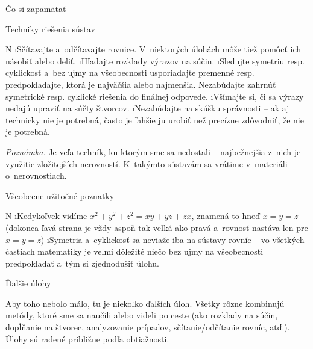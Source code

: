 \sec Čo si zapamätať

\secc Techniky riešenia sústav

\begitems \style N
\i Sčítavajte a~odčítavajte rovnice. V~niektorých úlohách môže tiež pomôcť ich násobiť alebo deliť.
\i Hľadajte rozklady výrazov na súčin. 
\i Sledujte symetriu resp. cyklickosť a~bez ujmy na všeobecnosti usporiadajte premenné resp. predpokladajte, ktorá je najväčšia alebo najmenšia. Nezabúdajte zahrnúť symetrické resp. cyklické riešenia do finálnej odpovede.
\i Všímajte si, či sa výrazy nedajú upraviť na súčty štvorcov. 
\i Nezabúdajte na skúšku správnosti -- ak aj technicky nie je potrebná, často je ľahšie ju urobiť než precízne zdôvodniť, že nie je potrebná.
\enditems

\textit{Poznámka.} Je veľa techník, ku ktorým sme sa nedostali -- najbežnejšia z~nich je využitie zložitejších nerovností. K~takýmto sústavám sa vrátime v~materiáli o~nerovnostiach.

\secc Všeobecne užitočné poznatky

\begitems \style N
\i Kedykoľvek vidíme $x^2+y^2+z^2 = xy+yz+zx$, znamená to hneď $x=y=z$ (dokonca ľavá strana je vždy aspoň tak veľká ako pravá a~rovnosť nastáva len pre $x=y=z$)
\i Symetria a~cyklickosť sa neviaže iba na sústavy rovníc -- vo všetkých častiach matematiky je veľmi dôležité niečo bez ujmy na všeobecnosti predpokladať a~tým si zjednodušiť úlohu.
\enditems

\sec Ďalšie úlohy

Aby toho nebolo málo, tu je niekoľko ďalších úloh. Všetky rôzne kombinujú metódy, ktoré sme sa naučili alebo videli po ceste (ako rozklady na súčin, dopĺňanie na štvorec, analyzovanie prípadov, sčítanie/odčítanie rovníc, atď.). Úlohy sú radené približne podľa obtiažnosti.


